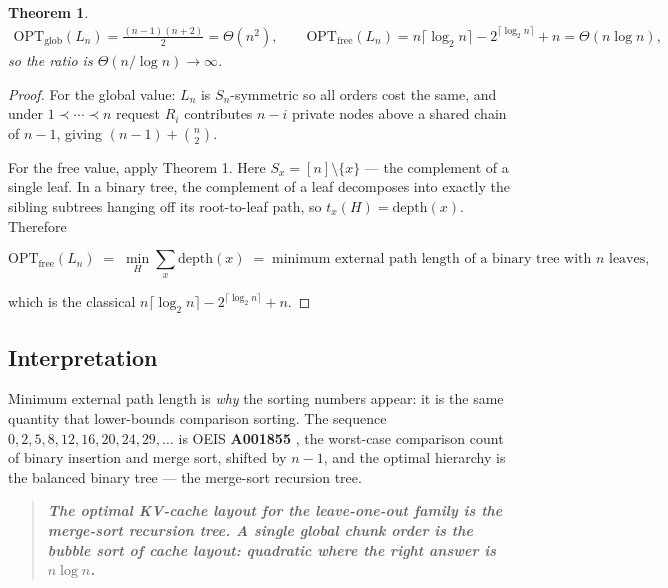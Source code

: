 \documentclass[11pt]{article}
\theoremstyle{plain}
\newtheorem{theorem}{Theorem}
\begin{document}
\begin{theorem}
\begin{equation}
\begin{split}
\mathrm{OPT}_{\mathrm{glob}}(L_n) = \frac{(n-1)(n+2)}{2} = \Theta(n^2), \qquad
\mathrm{OPT}_{\mathrm{free}}(L_n) = n\lceil \log_2 n\rceil - 2^{\lceil \log_2 n\rceil} + n = \Theta(n\log n),
\end{split}
\end{equation}
so the ratio is $\Theta(n/\log n) \to \infty$.
\end{theorem}
\begin{proof}
For the global value: $L_n$ is $S_n$-symmetric so all orders cost the same, and under $1\prec\cdots\prec n$ request $R_i$ contributes $n-i$ private nodes above a shared chain of $n-1$, giving $(n-1)+\binom{n}{2}$.

For the free value, apply Theorem 1. Here $S_x = [n]\setminus\{x\}$ --- the complement of a single leaf. In a binary tree, the complement of a leaf decomposes into exactly the sibling subtrees hanging off its root-to-leaf path, so $t_x(H) = \mathrm{depth}(x)$. Therefore

\begin{equation}
\mathrm{OPT}_{\mathrm{free}}(L_n) \;=\; \min_H \sum_{x} \mathrm{depth}(x) \;=\; \text{minimum external path length of a binary tree with } n \text{ leaves},
\end{equation}

which is the classical $n\lceil\log_2 n\rceil - 2^{\lceil\log_2 n\rceil}+n$. 
\end{proof}

\subsection{Interpretation}

Minimum external path length is \emph{why} the sorting numbers appear: it is the same quantity that lower-bounds comparison sorting. The sequence $0,2,5,8,12,16,20,24,29,\dots$ is OEIS \textbf{A001855} \cite{OEIS}, the worst-case comparison count of binary insertion and merge sort, shifted by $n-1$, and the optimal hierarchy is the balanced binary tree --- the merge-sort recursion tree.

\begin{quote}\itshape
\textbf{The optimal KV-cache layout for the leave-one-out family is the merge-sort recursion tree. A single global chunk order is the bubble sort of cache layout: quadratic where the right answer is $n\log n$.}
\end{quote}
\end{document}
